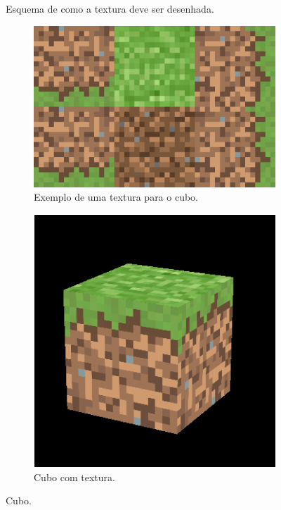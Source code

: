 \documentclass[a4paper]{article}
\begin{document}
\begin{figure}[H]
    \centering
    
    \caption{Esquema de como a textura deve ser desenhada.}
\end{figure}

\begin{figure}[H]
    \centering
    \begin{subfigure}{0.4\textwidth}
        \includegraphics[width=\textwidth]{../assets/grass_block.png}
        \caption{Exemplo de uma textura para o cubo.}
    \end{subfigure}
    \begin{subfigure}{0.4\textwidth}
        \centering
        \includegraphics[width=.63\textwidth]{box.png}
        \caption{Cubo com textura.}
    \end{subfigure}
    \caption{Cubo.}
\end{figure}
\end{document}
